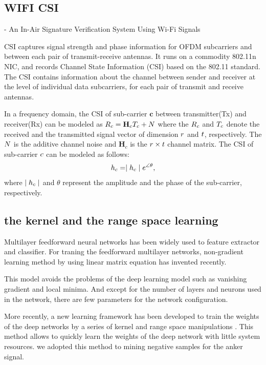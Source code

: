 \documentclass[runningheads]{llncs}
\begin{document}
\subsection{WIFI CSI}
- An In-Air Signature Verification System Using Wi-Fi Signals 

CSI captures signal strength and phase information for OFDM subcarriers and between each pair of transmit-receive antennas.
It runs on a commodity 802.11n NIC, and records Channel State Information (CSI) based on the 802.11 standard.
The CSI contains information about the channel between sender and receiver at the level of individual data subcarriers, for each pair of transmit and receive antennas.

In a frequency domain, the CSI of sub-carrier $\mathbf{c}$ between transmitter(Tx) and receiver(Rx) can be modeled as 
$\mathnormal{R}_{c} = \mathbf{H}_{c}\mathnormal{T}_{c} +\mathnormal{N}$ where the $\mathnormal{R}_{c}$ and $\mathnormal{T}_{c}$  denote the received and the transmitted signal vector of dimension $\mathnormal{r}$ and $\mathnormal{t}$, respectively. The $\mathnormal{N}$ is the additive channel noise and $\mathbf{H}_{c}$ is the $\mathnormal{r}\times\mathnormal{t}$ channel matrix. The CSI of sub-carrier $\mathnormal{c}$ can be modeled as follows:
\begin{equation}
    \mathnormal{h}_{c} = \mid\mathnormal{h}_{c}\mid\mathnormal{e}^{\angle\theta},
\end{equation}
where $\mid\mathnormal{h}_{c}\mid$ and $\theta$ represent the amplitude and the phase of the sub-carrier, respectively.

\subsection{the kernel and the range space learning}

Multilayer feedforward neural networks has been widely used to feature extractor and classifier.
For traning the feedforward multilayer networks, non-gradient learning method by using linear matrix equation has invented recently. \cite{wang2018review}

This model avoids the problems of the deep learning model such as vanishing gradient and local minima. And except for the number of layers and neurons used in the network, there are few parameters for the network configuration.

More recently, a new learning framework has been developed to train the weights of the deep networks by a series of kernel and range space manipulations \cite{toh2018gradient,toh2018learning}.
This method allows to quickly learn the weights of the deep network with little  system resources.
we adopted this method to mining negative samples for the anker signal.
\end{document}
